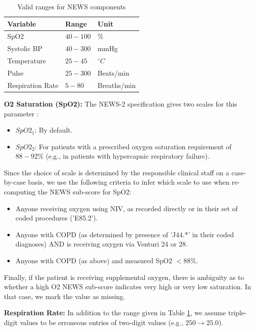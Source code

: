 \documentclass[10pt,journal, compsoc]{IEEEtran}
\begin{document}
\begin{table}[h]
    \renewcommand{\arraystretch}{1.3}
    \centering
    \caption{Valid ranges for NEWS components}
    \label{tab:news_valid_ranges}
    \begin{tabular}{lll}
        \toprule
        Variable         & Range    & Unit        \\
        \midrule
        SpO2             & $40-100$ & $\%$        \\
        Systolic BP      & $40-300$ & mmHg        \\
        Temperature      & $25-45$  & $^{\circ}C$ \\
        Pulse            & $25-300$ & Beats/min   \\
        Respiration Rate & $5-80$   & Breaths/min \\
        \bottomrule
    \end{tabular}
\end{table}

\textbf{O2 Saturation (SpO2): } The NEWS-2 specification gives two scales for this parameter \cite[pp.~44]{RCP17}:
\begin{itemize}
    \item $SpO2_1$: By default.
    \item $SpO2_2$: For patients with a prescribed oxygen saturation requirement of $88-92\%$ (e.g., in patients with hypercapnic respiratory failure).
\end{itemize}
Since the choice of scale is determined by the responsible clinical staff on a case-by-case basis, we use the following criteria to infer which scale to use when re-computing the NEWS sub-score for SpO2:
\begin{itemize}
    \item Anyone receiving oxygen using NIV, as recorded directly or in their set of coded procedures ('E85.2').
    \item Anyone with COPD (as determined by presence of 'J44.*' in their coded diagnoses) AND is receiving oxygen via Venturi 24 or 28.
    \item Anyone with COPD (as above) and measured SpO2 $<88\%$.
\end{itemize}
Finally, if the patient is receiving supplemental oxygen, there is ambiguity as to whether a high O2 NEWS sub-score indicates very high or very low saturation. In that case, we mark the value as missing.

\textbf{Respiration Rate: } In addition to the range given in Table \ref{tab:news_valid_ranges}, we assume triple-digit values to be erroneous entries of two-digit values (e.g., $250 \rightarrow 25.0$).
\end{document}
